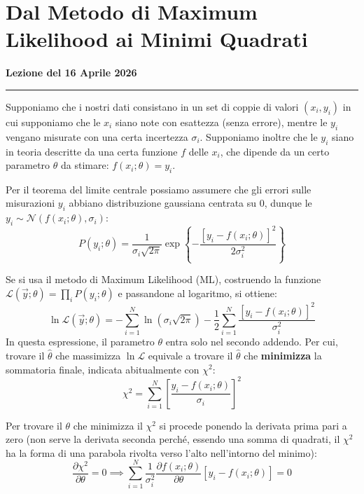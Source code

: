 \documentclass[openany,a4paper,12pt]{book}
\providecommand{\mathscr}[1]{\mathcal{#1}}
\theoremstyle{remark}
\newcommand{\thelezione}{}
\newcommand{\lezione}[2]{
\newpage
\renewcommand{\thelezione}{#2} 
\section{#1} 
\noindent\textbf{\color{RoyalBlue}Lezione del #2}\par\vspace{0.5em}\hrule\vspace{1em}
}
\begin{document}
\lezione{Dal Metodo di Maximum Likelihood ai Minimi Quadrati}{16 Aprile 2026}



Supponiamo che i nostri dati consistano in un set di coppie di valori $(x_i, y_i)$ in cui supponiamo che le $x_i$ siano note con esattezza (senza errore), mentre le $y_i$ vengano misurate con una certa incertezza $\sigma_i$. 
Supponiamo inoltre che le $y_i$ siano in teoria descritte da una certa funzione $f$ delle $x_i$, che dipende da un certo parametro $\theta$ da stimare: $f(x_i; \theta) = y_i$.

Per il teorema del limite centrale possiamo assumere che gli errori sulle misurazioni $y_i$ abbiano distribuzione gaussiana centrata su 0, dunque le $y_i \sim \mathcal{N}(f(x_i; \theta), \sigma_i)$:
\begin{equation}
    P(y_i; \theta) = \frac{1}{\sigma_i \sqrt{2\pi}} \exp \left\{ -\frac{[y_i - f(x_i; \theta)]^2}{2\sigma_i^2} \right\}
\end{equation}

Se si usa il metodo di Maximum Likelihood (ML), costruendo la funzione $\mathscr{L}(\vec{y}; \theta) = \prod_i P(y_i; \theta)$ e passandone al logaritmo, si ottiene:
\begin{equation}
    \ln \mathscr{L}(\vec{y}; \theta) = -\sum_{i=1}^N \ln(\sigma_i \sqrt{2\pi}) - \frac{1}{2} \sum_{i=1}^N \frac{[y_i - f(x_i; \theta)]^2}{\sigma_i^2}
    \label{eq:lnL_min_quad}
\end{equation}
In questa espressione, il parametro $\theta$ entra solo nel secondo addendo. Per cui, trovare il $\hat{\theta}$ che massimizza $\ln \mathscr{L}$ equivale a trovare il $\hat{\theta}$ che \textbf{minimizza} la sommatoria finale, indicata abitualmente con $\chi^2$:
\begin{equation}
    \chi^2 = \sum_{i=1}^N \left[ \frac{y_i - f(x_i; \theta)}{\sigma_i} \right]^2
\end{equation}

Per trovare il $\theta$ che minimizza il $\chi^2$ si procede ponendo la derivata prima pari a zero (non serve la derivata seconda perché, essendo una somma di quadrati, il $\chi^2$ ha la forma di una parabola rivolta verso l'alto nell'intorno del minimo):
\begin{equation}
    \frac{\partial \chi^2}{\partial \theta} = 0 \implies \sum_{i=1}^N \frac{1}{\sigma_i^2} \frac{\partial f(x_i; \theta)}{\partial \theta}[y_i - f(x_i; \theta)] = 0
\end{equation}
\end{document}
